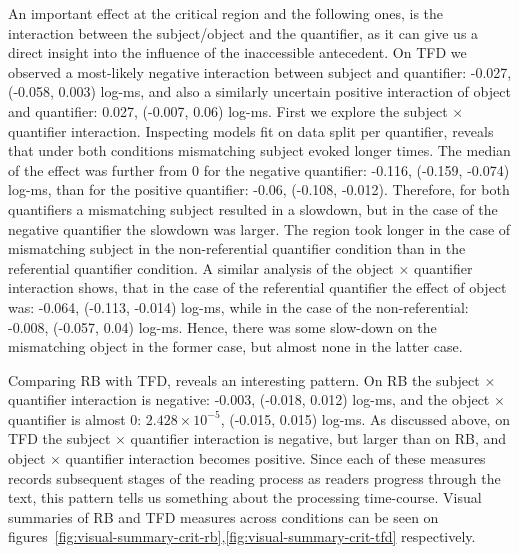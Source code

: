 An important effect at the critical region and the following ones, is the
interaction between the subject/object and the quantifier, as it can give us a direct
insight into the influence of the inaccessible antecedent. On TFD we observed a most-likely negative interaction between subject and quantifier: -0.027, (-0.058, 0.003) log-ms, and also a similarly uncertain positive interaction of object and quantifier: 0.027, (-0.007, 0.06) log-ms.
First we explore the subject $\times$ quantifier interaction. Inspecting models fit on data split per quantifier, reveals that under both conditions mismatching subject evoked longer times.
The median of the effect was further from 0 for the negative quantifier: -0.116, (-0.159, -0.074) log-ms, than for the positive quantifier: -0.06, (-0.108, -0.012).
Therefore, for both quantifiers a mismatching subject resulted in a slowdown, but in the case of the negative quantifier the slowdown was larger.  The region took longer in the case of mismatching subject in the non-referential quantifier condition than in the referential quantifier condition.
A similar analysis of the object $\times$ quantifier interaction shows, that in the case of the referential quantifier the effect of object was: -0.064, (-0.113, -0.014) log-ms, while in the case of the non-referential: -0.008, (-0.057, 0.04) log-ms. Hence, there was some slow-down on the mismatching object in the former case, but almost none in the latter case.

Comparing RB with TFD, reveals an interesting pattern. On RB the subject $\times$ quantifier interaction is negative: -0.003, (-0.018, 0.012) log-ms, and the object $\times$ quantifier is almost 0: \ensuremath{2.428\times 10^{-5}}, (-0.015, 0.015) log-ms.
As discussed above, on TFD the subject $\times$ quantifier interaction is negative, but larger than on RB, and object $\times$ quantifier interaction becomes positive. Since each of these measures records subsequent stages of the reading process as readers progress through the text, this pattern tells us something about the processing time-course.
Visual summaries of RB and TFD measures across conditions can be seen on figures~\ref{fig:visual-summary-crit-rb},\ref{fig:visual-summary-crit-tfd} respectively.

